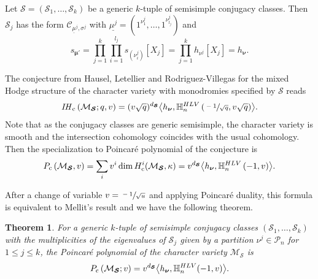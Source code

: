 \documentclass[11pt]{article}
\newcommand{\rc}{\mathrm{c}}
\newcommand{\HLV}{\textup{HLV}}
\newcommand{\blangle}{\bigl\langle}
\newcommand{\brangle}{\bigr\rangle}
\theoremstyle{definition}
\theoremstyle{plain}
\newtheorem{theorem}[definition]{Theorem}
\newcommand{\IH}{\mathit{IH}}
\newcommand{\Part}{\mathcal{P}}
\begin{document}
Let $\boldsymbol{\mathcal{S}}=(\mathcal{S}_1,\dots,\mathcal{S}_k)$ be a generic $k$-tuple of semisimple conjugacy classes. Then $\mathcal{S}_j$ has the form $\mathcal{C}_{\underline{\mu}^j,\sigma^j}$ with
$\underline{\mu^j}=(1^{\nu^j_1},\dots,1^{\nu^j_{l_j}})$ and
\[
s_{\boldsymbol{\mu'}} = \prod_{j=1}^k\prod_{i=1}^{l_j} s_{(\nu^j_i)}[X_j] = \prod_{j=1}^k h_{\nu^j}[X_j] = h_{\boldsymbol{\nu}}.
\]

The conjecture from Hausel, Letellier and Rodriguez-Villegas \cite{Hausel_Letellier_Villegas} for the mixed Hodge structure of the character variety with monodromies specified by $\boldsymbol{\mathcal{S}}$ reads
\[
\IH_{\rc} \left(\mathcal{M}_{\boldsymbol{\mathcal{S}}};q,v\right) = (v \sqrt{q})^{d_{\boldsymbol{\mathcal{S}}}}\blangle h_{\boldsymbol{\nu}}, \mathbb{H}_n^{\HLV}\left(\sfrac{-1}{\sqrt{q}},v\sqrt{q}\right)\brangle.
\]
Note that as the conjugacy classes are generic semisimple, the character variety is smooth and the intersection cohomology coincides with the usual cohomology. Then the specialization to Poincaré polynomial of the conjecture is
\begin{equation}\label{eq_poincare_ss}
P_{\rc}\left(\mathcal{M}_{\boldsymbol{\mathcal{S}}}, v\right) = \sum_{i} v^i \dim H_\rc^i(\mathcal{M}_{\boldsymbol{\mathcal{S}}},\kappa) = v^{d_{\boldsymbol{\mathcal{S}}}}\blangle h_{\boldsymbol{\nu}}, \mathbb{H}^{\HLV}_n\left(-1,v\right)\brangle.
\end{equation}

After a change of variable $v=\sfrac{-1}{\sqrt{u}}$ and applying Poincaré duality, this formula is equivalent to Mellit's result \cite[Th.\,7.12]{Mellit2020} and we have the following theorem.
\begin{theorem}\label{th_mellit}
For a generic $k$-tuple of semisimple conjugacy classes $\left(\mathcal{S}_1,\dots,\mathcal{S}_k\right)$ with the multiplicities of the eigenvalues of $\mathcal{S}_j$ given by a partition $\nu^j\in \Part_n$ for $1\le j \le k$, the Poincaré polynomial of the character variety $\mathcal{M}_{\boldsymbol{\mathcal{S}}}$ is
\begin{equation}\label{eq_poincare_mellit}
P_{\rc} \left(\mathcal{M}_{\boldsymbol{\mathcal{S}}}; v\right) = v^{d_{\boldsymbol{\mathcal{S}}}}\blangle h_{\boldsymbol{\nu}}, \mathbb{H}_n^{\HLV}(-1,v)\brangle.
\end{equation}
\end{theorem}
\end{document}
